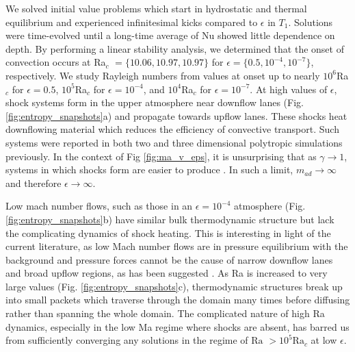 \documentclass[aps, prl, twocolumn, nofootinbib, groupedaddress, amsfonts, amssymb, amsmath]{revtex4-1}
\begin{document}
We solved initial value problems which start in hydrostatic and thermal equilibrium and experienced infinitesimal 
kicks compared to $\epsilon$ in $T_1$.  Solutions were time-evolved until a long-time average of Nu showed little
dependence on depth. By performing a linear stability analysis, we determined that the onset of convection
occurs at Ra$_c$ $= \{10.06, 10.97, 10.97\}$ for $\epsilon = \{0.5, 10^{-4}, 10^{-7}\}$, respectively.  We study Rayleigh
numbers from values at onset up to nearly $10^6$Ra$_c$ for $\epsilon = 0.5$, $10^5$Ra$_c$ for $\epsilon = 10^{-4}$,
and $10^4$Ra$_c$ for $\epsilon = 10^{-7}$.  At
high values of $\epsilon$, shock systems form in the upper atmosphere near downflow lanes 
(Fig. \ref{fig:entropy_snapshots}a) and propagate towards upflow lanes.  
These shocks heat downflowing material which reduces the efficiency of convective transport.
Such systems were reported in
both two \cite{cattaneo&all1990} and three \cite{malagoli&all1990} dimensional polytropic simulations previously.
In the context of Fig \ref{fig:ma_v_eps}, it is unsurprising that as $\gamma \rightarrow 1$, systems in which shocks
form are easier to produce \cite{cattaneo&all1990}.  In such a limit, $m_{ad} \rightarrow \infty$ 
and therefore $\epsilon \rightarrow \infty$.

Low mach number flows, such as those in an $\epsilon = 10^{-4}$ atmosphere (Fig. \ref{fig:entropy_snapshots}b)
have similar bulk thermodynamic structure but lack the complicating dynamics of shock heating. This is interesting
in light of the current literature, as low Mach number flows are in pressure equilibrium with the background and
pressure forces cannot be the cause of narrow downflow lanes and broad upflow regions, as has been suggested
\cite{hurlburt&all1984}.  As Ra is
increased to very large values (Fig. \ref{fig:entropy_snapshots}c), thermodynamic structures 
break up into small packets which traverse through the domain many
times before diffusing rather than spanning the whole domain.  
The complicated nature of high Ra dynamics, especially in the low Ma regime where
shocks are absent, has barred us from sufficiently converging any solutions in the regime of 
$\text{Ra }> 10^5\text{Ra}_c$ at low $\epsilon$.
\end{document}
